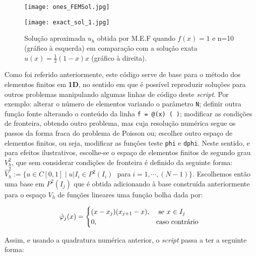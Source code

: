 \documentclass{article}
\theoremstyle{definition}
\theoremstyle{plain}
\numberwithin{equation}{section}
\newcommand{\tab}{\hspace{10mm}}
\begin{document}
\begin{figure} [H]
\centering
\begin{minipage}{0.5\textwidth}
  \centering
  \texttt{[image: ones\_FEMSol.jpg]}
\end{minipage}%
\begin{minipage}{0.5\textwidth}
  \centering
  \texttt{[image: exact\_sol\_1.jpg]}
\end{minipage}
\caption{Solução aproximada $u_h$ obtida por M.E.F quando $f(x)=1$ e n=10 (gráfico à esquerda) em comparação com a solução exata $u(x)=\frac{1}{2}(1-x)x$ (gráfico à direita).}
\end{figure}

\vspace{5mm}

\tab Como foi referido anteriormente, este código serve de base para o método dos elementos finitos em \textbf{1D}, no sentido em que é possível reproduzir soluções para outros problemas manipulando algumas linhas de código deste \emph{script}. Por exemplo: alterar o número de elementos variando o parâmetro \verb +N+;  definir outra função fonte alterando o conteúdo da linha \verb+f = @(x) ( )+; modificar as condições de fronteira, obtendo outro problema, mas cuja resolução numérica segue os passos da forma fraca do problema de Poisson ou; escolher outro espaço de elementos finitos, ou seja, modificar as funções teste \verb +phi+ e \verb+dphi+. 
Neste sentido, e para efeitos ilustrativos, escolhe-se o espaço de elementos finitos de segundo grau $V_h^2$, que sem considerar condições de fronteira é definido da seguinte forma: $\hat{V}_h^2:=\{u \in C[0,1] \; | \; u|I_i \in P^2(I_i)\;$ para$\; i=1,\cdots,(N-1)\}$. Escolhemos então uma base em $P^2(I_j)$ que é obtida adicionando à base construída anteriormente para o espaço $V_h$ de funções lineares uma função bolha dada por:

\begin{equation*}
     \hat{\varphi}_j(x) = \begin{cases} $$(x-x_j)(x_{j+1}-x)$$, & \mbox{ se } x\mbox{ $\in I_j$} \\ 0, & \mbox{caso contrário}
     \end{cases}
\end{equation*}

\vspace{5mm}

Assim, e usando a quadratura numérica anterior, o \emph{script} passa a ter a seguinte forma:
\end{document}
